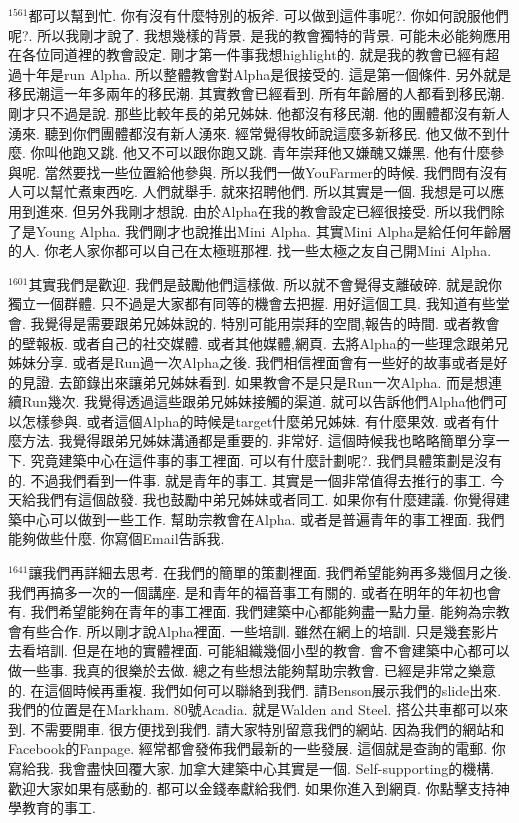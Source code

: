 \documentclass{book}
\begin{document}
$^{1561}$都可以幫到忙.
你有沒有什麼特別的板斧.
可以做到這件事呢?.
你如何說服他們呢?.
所以我剛才說了.
我想幾樣的背景.
是我的教會獨特的背景.
可能未必能夠應用在各位同道裡的教會設定.
剛才第一件事我想highlight的.
就是我的教會已經有超過十年是run Alpha.
所以整體教會對Alpha是很接受的.
這是第一個條件.
另外就是移民潮這一年多兩年的移民潮.
其實教會已經看到.
所有年齡層的人都看到移民潮.
剛才只不過是說.
那些比較年長的弟兄姊妹.
他都沒有移民潮.
他的團體都沒有新人湧來.
聽到你們團體都沒有新人湧來.
經常覺得牧師說這麼多新移民.
他又做不到什麼.
你叫他跑又跳.
他又不可以跟你跑又跳.
青年崇拜他又嫌醜又嫌黑.
他有什麼參與呢.
當然要找一些位置給他參與.
所以我們一做YouFarmer的時候.
我們問有沒有人可以幫忙煮東西吃.
人們就舉手.
就來招聘他們.
所以其實是一個.
我想是可以應用到進來.
但另外我剛才想說.
由於Alpha在我的教會設定已經很接受.
所以我們除了是Young Alpha.
我們剛才也說推出Mini Alpha.
其實Mini Alpha是給任何年齡層的人.
你老人家你都可以自己在太極班那裡.
找一些太極之友自己開Mini Alpha.

$^{1601}$其實我們是歡迎.
我們是鼓勵他們這樣做.
所以就不會覺得支離破碎.
就是說你獨立一個群體.
只不過是大家都有同等的機會去把握.
用好這個工具.
我知道有些堂會.
我覺得是需要跟弟兄姊妹說的.
特別可能用崇拜的空間,報告的時間.
或者教會的壁報板.
或者自己的社交媒體.
或者其他媒體,網頁.
去將Alpha的一些理念跟弟兄姊妹分享.
或者是Run過一次Alpha之後.
我們相信裡面會有一些好的故事或者是好的見證.
去節錄出來讓弟兄姊妹看到.
如果教會不是只是Run一次Alpha.
而是想連續Run幾次.
我覺得透過這些跟弟兄姊妹接觸的渠道.
就可以告訴他們Alpha他們可以怎樣參與.
或者這個Alpha的時候是target什麼弟兄姊妹.
有什麼果效.
或者有什麼方法.
我覺得跟弟兄姊妹溝通都是重要的.
非常好.
這個時候我也略略簡單分享一下.
究竟建築中心在這件事的事工裡面.
可以有什麼計劃呢?.
我們具體策劃是沒有的.
不過我們看到一件事.
就是青年的事工.
其實是一個非常值得去推行的事工.
今天給我們有這個啟發.
我也鼓勵中弟兄姊妹或者同工.
如果你有什麼建議.
你覺得建築中心可以做到一些工作.
幫助宗教會在Alpha.
或者是普遍青年的事工裡面.
我們能夠做些什麼.
你寫個Email告訴我.

$^{1641}$讓我們再詳細去思考.
在我們的簡單的策劃裡面.
我們希望能夠再多幾個月之後.
我們再搞多一次的一個講座.
是和青年的福音事工有關的.
或者在明年的年初也會有.
我們希望能夠在青年的事工裡面.
我們建築中心都能夠盡一點力量.
能夠為宗教會有些合作.
所以剛才說Alpha裡面.
一些培訓.
雖然在網上的培訓.
只是幾套影片去看培訓.
但是在地的實體裡面.
可能組織幾個小型的教會.
會不會建築中心都可以做一些事.
我真的很樂於去做.
總之有些想法能夠幫助宗教會.
已經是非常之樂意的.
在這個時候再重複.
我們如何可以聯絡到我們.
請Benson展示我們的slide出來.
我們的位置是在Markham.
80號Acadia.
就是Walden and Steel.
搭公共車都可以來到.
不需要開車.
很方便找到我們.
請大家特別留意我們的網站.
因為我們的網站和Facebook的Fanpage.
經常都會發佈我們最新的一些發展.
這個就是查詢的電郵.
你寫給我.
我會盡快回覆大家.
加拿大建築中心其實是一個.
Self-supporting的機構.
歡迎大家如果有感動的.
都可以金錢奉獻給我們.
如果你進入到網頁.
你點擊支持神學教育的事工.
\end{document}
